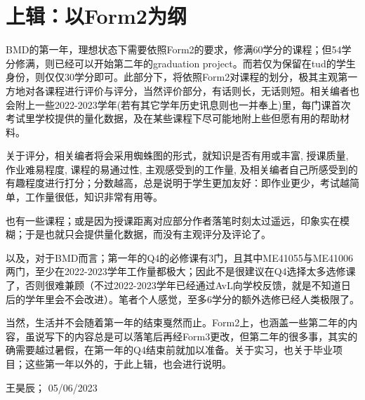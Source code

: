 \section{上辑：以Form2为纲}
BMD的第一年，理想状态下需要依照Form2的要求，修满60学分的课程；但54学分修满，则已经可以开始第二年的graduation project。而若仅为保留在tud的学生身份，则仅仅30学分即可。此部分下，将依照Form2对课程的划分，极其主观第一方地对各课程进行评价与评分，当然评价部分，有话则长，无话则短。相关编者也会附上一些2022-2023学年(若有其它学年历史讯息则也一并奉上)里，每门课首次考试里学校提供的量化数据，及在某些课程下尽可能地附上些但愿有用的帮助材料。

关于评分，相关编者将会采用蜘蛛图的形式，就知识是否有用或丰富, 授课质量, 作业难易程度, 课程的易通过性, 主观感受到的工作量, 及相关编者自己所感受到的有趣程度进行打分；分数越高，总是说明于学生更加友好：即作业更少，考试越简单，工作量很低，知识非常有用等。

也有一些课程；或是因为授课距离对应部分作者落笔时刻太过遥远，印象实在模糊；于是也就只会提供量化数据，而没有主观评分及评论了。

以及，对于BMD而言；第一年的Q4的必修课有3门，且其中ME41055与ME41006两门，至少在2022-2023学年工作量都极大；因此不是很建议在Q4选择太多选修课了，否则很难兼顾（不过2022-2023学年已经通过AvL向学校反馈，就是不知道日后的学年里会不会改进）。笔者个人感觉，至多6学分的额外选修已经人类极限了。

当然，生活并不会随着第一年的结束戛然而止。Form2上，也涵盖一些第二年的内容，虽说写下的内容总是可以落笔后再经Form3更改，但第二年的很多事，其实的确需要越过暑假，在第一年的Q4结束前就加以准备。关于实习，也关于毕业项目；这些第一年以外的，于此上辑，也会进行说明。
\begin{flushright}
王昊辰； 05/06/2023
\end{flushright}








